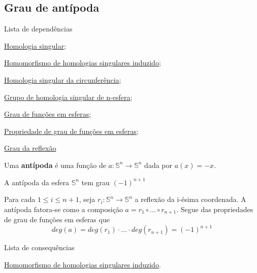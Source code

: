 \subsection{Grau de antípoda} %
\label{grau-de-antipoda-prop}
\begin{titlemize}{Lista de dependências}
    \item \hyperref[homologia-singular-def]{Homologia singular};\\
    \item \hyperref[homomorfismo-de-homologias-singulares-induzido-prop]{Homomorfismo de homologias singulares induzido};\\
    \item \hyperref[homologia-singular-de-S1-prop]{Homologia singular da circunferência};\\
    \item \hyperref[grupo-de-homologia-singular-de-n-esfera-prop]{Grupo de homologia singular de n-esfera};\\
    \item \hyperref[grau-de-funcoes-em-esferas-def]{Grau de funções em esferas};\\
    \item \hyperref[propriedades-de-grau-de-funções-prop]{Propriedade de grau de funções em esferas};\\
    \item \hyperref[grau-da-reflexao-prop]{Grau da reflexão}
\end{titlemize}

\begin{defi}
    Uma \textbf{antípoda} é uma função de $a:\mathbb{S}^n\rightarrow \mathbb{S}^n$ dada por $a(x)=-x$.
\end{defi}

\begin{lemma}
    A antípoda da esfera $\mathbb{S}^n$ tem grau $(-1)^{n+1}$
\end{lemma}

\begin{dem}
    Para cada $1\le i\le n+1$, seja $r_i: \mathbb{S}^n\rightarrow \mathbb{S}^n$ a reflexão da i-ésima coordenada. A antípoda fatora-se como a composição $a=r_1\circ ...\circ r_{n+1}$. Segue das propriedades de grau de funções em esferas que 
    \[deg(a)=deg(r_1)\cdot...\cdot deg(r_{n+1})=(-1)^{n+1}\]
\end{dem}

\begin{titlemize}{Lista de consequências}
    \item \hyperref[homomorfismo-de-homologias-singulares-induzido-prop]{Homomorfismo de homologias singulares induzido}.\\
\end{titlemize}
